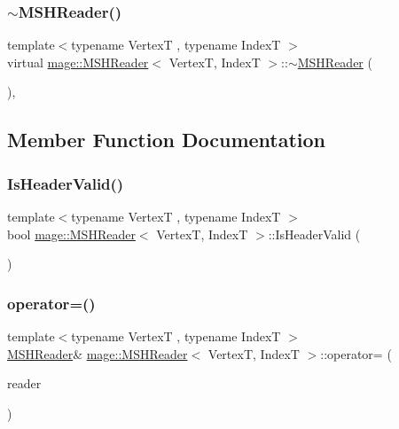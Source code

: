 \subsubsection{\texorpdfstring{$\sim$\+M\+S\+H\+Reader()}{~MSHReader()}}
{\footnotesize\ttfamily template$<$typename VertexT , typename IndexT $>$ \\
virtual \hyperlink{classmage_1_1_m_s_h_reader}{mage\+::\+M\+S\+H\+Reader}$<$ VertexT, IndexT $>$\+::$\sim$\hyperlink{classmage_1_1_m_s_h_reader}{M\+S\+H\+Reader} (\begin{DoxyParamCaption}{ }\end{DoxyParamCaption})\hspace{0.3cm}{\ttfamily [virtual]}, {\ttfamily [default]}}



\subsection{Member Function Documentation}
\hypertarget{classmage_1_1_m_s_h_reader_a2bc2f2a6410de600c39336f4516a5231}{}\label{classmage_1_1_m_s_h_reader_a2bc2f2a6410de600c39336f4516a5231} 
\subsubsection{\texorpdfstring{Is\+Header\+Valid()}{IsHeaderValid()}}
{\footnotesize\ttfamily template$<$typename VertexT , typename IndexT $>$ \\
bool \hyperlink{classmage_1_1_m_s_h_reader}{mage\+::\+M\+S\+H\+Reader}$<$ VertexT, IndexT $>$\+::Is\+Header\+Valid (\begin{DoxyParamCaption}{ }\end{DoxyParamCaption})\hspace{0.3cm}{\ttfamily [private]}}

\hypertarget{classmage_1_1_m_s_h_reader_abbe36c0fcfbf0c909a45f974c34ecc3a}{}\label{classmage_1_1_m_s_h_reader_abbe36c0fcfbf0c909a45f974c34ecc3a} 
\subsubsection{\texorpdfstring{operator=()}{operator=()}\hspace{0.1cm}{\footnotesize\ttfamily [1/2]}}
{\footnotesize\ttfamily template$<$typename VertexT , typename IndexT $>$ \\
\hyperlink{classmage_1_1_m_s_h_reader}{M\+S\+H\+Reader}\& \hyperlink{classmage_1_1_m_s_h_reader}{mage\+::\+M\+S\+H\+Reader}$<$ VertexT, IndexT $>$\+::operator= (\begin{DoxyParamCaption}\item[{const \hyperlink{classmage_1_1_m_s_h_reader}{M\+S\+H\+Reader}$<$ VertexT, IndexT $>$ \&}]{reader }\end{DoxyParamCaption})\hspace{0.3cm}{\ttfamily [delete]}}

